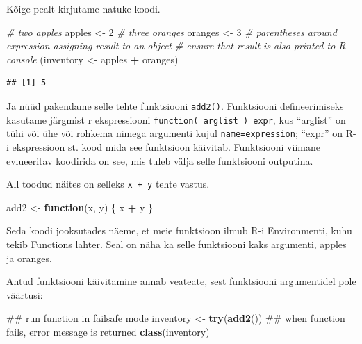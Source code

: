 \documentclass[]{book}
\newenvironment{Shaded}{\begin{snugshade}}{\end{snugshade}}
\newcommand{\KeywordTok}[1]{\textcolor[rgb]{0.13,0.29,0.53}{\textbf{#1}}}
\newcommand{\DecValTok}[1]{\textcolor[rgb]{0.00,0.00,0.81}{#1}}
\newcommand{\StringTok}[1]{\textcolor[rgb]{0.31,0.60,0.02}{#1}}
\newcommand{\CommentTok}[1]{\textcolor[rgb]{0.56,0.35,0.01}{\textit{#1}}}
\newcommand{\ControlFlowTok}[1]{\textcolor[rgb]{0.13,0.29,0.53}{\textbf{#1}}}
\newcommand{\OperatorTok}[1]{\textcolor[rgb]{0.81,0.36,0.00}{\textbf{#1}}}
\newcommand{\NormalTok}[1]{#1}
\begin{document}
Kõige pealt kirjutame natuke koodi.

\begin{Shaded}
\begin{Highlighting}[]
\CommentTok{# two apples}
\NormalTok{apples <-}\StringTok{ }\DecValTok{2}
\CommentTok{# three oranges}
\NormalTok{oranges <-}\StringTok{ }\DecValTok{3} 
\CommentTok{# parentheses around expression assigning result to an object }
\CommentTok{# ensure that result is also printed to R console}
\NormalTok{(inventory <-}\StringTok{ }\NormalTok{apples }\OperatorTok{+}\StringTok{ }\NormalTok{oranges)}
\end{Highlighting}
\end{Shaded}

\begin{verbatim}
## [1] 5
\end{verbatim}

Ja nüüd pakendame selle tehte funktsiooni \texttt{add2()}. Funktsiooni
defineerimiseks kasutame järgmist r ekspressiooni
\texttt{function(\ arglist\ )\ expr}, kus ``arglist'' on tühi või ühe
või rohkema nimega argumenti kujul \texttt{name=expression}; ``expr'' on
R-i ekspressioon st. kood mida see funktsioon käivitab. Funktsiooni
viimane evlueeritav koodirida on see, mis tuleb välja selle funktsiooni
outputina.

All toodud näites on selleks \texttt{x\ +\ y} tehte vastus.

\begin{Shaded}
\begin{Highlighting}[]
\NormalTok{add2 <-}\StringTok{ }\ControlFlowTok{function}\NormalTok{(x, y) \{}
\NormalTok{    x }\OperatorTok{+}\StringTok{ }\NormalTok{y}
\NormalTok{\}}
\end{Highlighting}
\end{Shaded}

Seda koodi jooksutades näeme, et meie funktsioon ilmub R-i Environmenti,
kuhu tekib Functions lahter. Seal on näha ka selle funktsiooni kaks
argumenti, apples ja oranges.

Antud funktsiooni käivitamine annab veateate, sest funktsiooni
argumentidel pole väärtusi:

\begin{Shaded}
\begin{Highlighting}[]
\NormalTok{## run function in failsafe mode}
\NormalTok{inventory <-}\StringTok{ }\KeywordTok{try}\NormalTok{(}\KeywordTok{add2}\NormalTok{())}
\NormalTok{## when function fails, error message is returned}
\KeywordTok{class}\NormalTok{(inventory)}
\end{Highlighting}
\end{Shaded}
\end{document}
